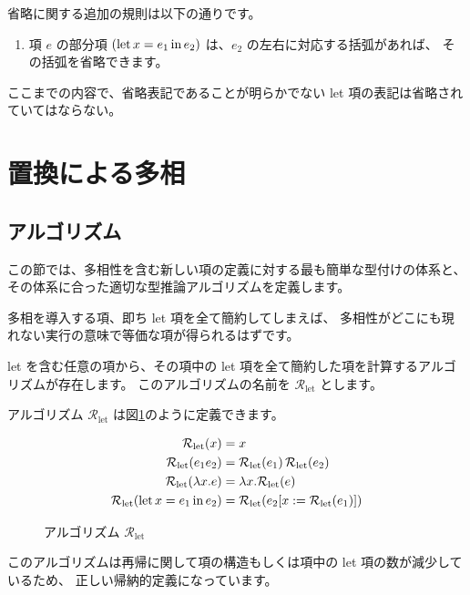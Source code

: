 省略に関する追加の規則は以下の通りです。

\begin{enumerate}
  \item 項 $e$ の部分項 $(\mathrm{let} \, x = e_1 \, \mathrm{in} \, e_2)$ は、$e_2$ の左右に対応する括弧があれば、
        その括弧を省略できます。
\end{enumerate}

\begin{note}
ここまでの内容で、省略表記であることが明らかでない let 項の表記は省略されていてはならない。
\end{note}

\section{置換による多相}

\subsection{アルゴリズム}

この節では、多相性を含む新しい項の定義に対する最も簡単な型付けの体系と、
その体系に合った適切な型推論アルゴリズムを定義します。

多相を導入する項、即ち let 項を全て簡約してしまえば、
多相性がどこにも現れない実行の意味で等価な項が得られるはずです。

let を含む任意の項から、その項中の let 項を全て簡約した項を計算するアルゴリズムが存在します。
このアルゴリズムの名前を $\mathcal R_\mathrm{let}$ とします。

アルゴリズム $\mathcal R_\mathrm{let}$ は図\ref{fig:algorithm-rlet}のように定義できます。

\begin{figure}[htbp]
  \begin{align*}
    \mathcal R_\mathrm{let}(x) &= x \\
    \mathcal R_\mathrm{let}(e_1 e_2) &=
      \mathcal R_\mathrm{let}(e_1) \, \mathcal R_\mathrm{let}(e_2) \\
    \mathcal R_\mathrm{let}(\lambda x . e) &=
      \lambda x . \mathcal R_\mathrm{let}(e) \\
    \mathcal R_\mathrm{let}(\mathrm{let} \, x = e_1 \, \mathrm{in} \, e_2) &=
      \mathcal R_\mathrm{let}(e_2 [x := \mathcal R_\mathrm{let}(e_1)])
  \end{align*}
  \caption{アルゴリズム $\mathcal R_\mathrm{let}$}
  \label{fig:algorithm-rlet}
\end{figure}

このアルゴリズムは再帰に関して項の構造もしくは項中の let 項の数が減少しているため、
正しい帰納的定義になっています。

